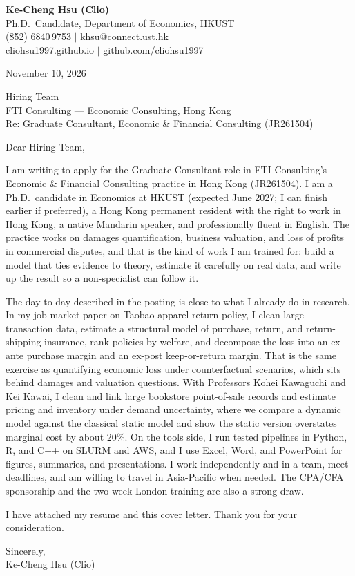 \documentclass[11pt,letterpaper]{article}
\begin{document}
\noindent
{\bfseries Ke-Cheng Hsu (Clio)}\\
Ph.D.\ Candidate, Department of Economics, HKUST\\
(852) 6840\,9753 \quad $|$ \quad \href{mailto:khsu@connect.ust.hk}{khsu@connect.ust.hk}\\
\href{https://cliohsu1997.github.io/}{cliohsu1997.github.io} \quad $|$ \quad \href{https://github.com/cliohsu1997}{github.com/cliohsu1997}

\vspace{0.7em}
\noindent
November 10, 2026

\vspace{0.35em}
\noindent
Hiring Team\\
FTI Consulting --- Economic Consulting, Hong Kong\\
Re: Graduate Consultant, Economic \& Financial Consulting (JR261504)

\vspace{0.2em}
Dear Hiring Team,

I am writing to apply for the Graduate Consultant role in FTI Consulting's Economic \& Financial Consulting practice in Hong Kong (JR261504). I am a Ph.D.\ candidate in Economics at HKUST (expected June 2027; I can finish earlier if preferred), a Hong Kong permanent resident with the right to work in Hong Kong, a native Mandarin speaker, and professionally fluent in English. The practice works on damages quantification, business valuation, and loss of profits in commercial disputes, and that is the kind of work I am trained for: build a model that ties evidence to theory, estimate it carefully on real data, and write up the result so a non-specialist can follow it.

The day-to-day described in the posting is close to what I already do in research. In my job market paper on Taobao apparel return policy, I clean large transaction data, estimate a structural model of purchase, return, and return-shipping insurance, rank policies by welfare, and decompose the loss into an ex-ante purchase margin and an ex-post keep-or-return margin. That is the same exercise as quantifying economic loss under counterfactual scenarios, which sits behind damages and valuation questions. With Professors Kohei Kawaguchi and Kei Kawai, I clean and link large bookstore point-of-sale records and estimate pricing and inventory under demand uncertainty, where we compare a dynamic model against the classical static model and show the static version overstates marginal cost by about 20\%. On the tools side, I run tested pipelines in Python, R, and C++ on SLURM and AWS, and I use Excel, Word, and PowerPoint for figures, summaries, and presentations. I work independently and in a team, meet deadlines, and am willing to travel in Asia-Pacific when needed. The CPA/CFA sponsorship and the two-week London training are also a strong draw.

I have attached my resume and this cover letter. Thank you for your consideration.

\vspace{0.7em}
Sincerely,\\[1.0em]
Ke-Cheng Hsu (Clio)
\end{document}

